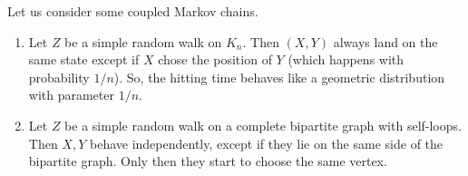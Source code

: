 \begin{example}
    Let us consider some coupled Markov chains.
    \begin{enumerate}
        \item Let $Z$ be a simple random walk on $K_n$.
              Then $(X,Y)$ always land on the same state except if $X$ chose the position of $Y$ (which happens with probability $1/n$).
              So, the hitting time behaves like a geometric distribution with parameter $1/n$.
        \item Let $Z$ be a simple random walk on a complete bipartite graph with self-loops.
              Then $X,Y$ behave independently, except if they lie on the same side of the bipartite graph.
              Only then they start to choose the same vertex.
    \end{enumerate}
\end{example}